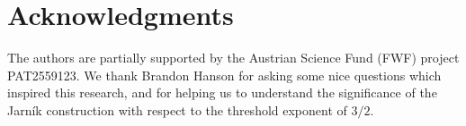 \documentclass[11pt]{amsart}
\begin{document}
\section*{Acknowledgments} The authors are partially supported by the Austrian Science Fund (FWF) project PAT2559123. We thank Brandon Hanson for asking some nice questions which inspired this research, and for helping us to understand the significance of the Jarn\'{i}k construction with respect to the threshold exponent of $3/2$.



\renewcommand{\bibname}{\Large References}
\end{document}
